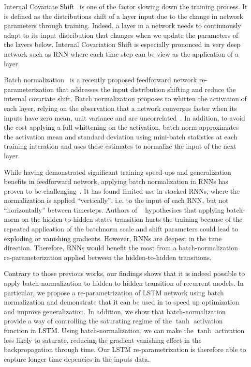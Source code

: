 \documentclass{article} %
\begin{document}
Internal Covariate Shift~\cite{shimodaira2000improving,batchnorm} is one of the factor slowing down the training process.
It is defined as the distributions shift of a layer input due to the change in network parameters through training.
Indeed, a layer in a network needs to continuously adapt to its input distribution that changes when we update the parameters of the layers below.
Internal Covariation Shift is especially prononced in very deep network such as RNN where each time-step can be view as the application of a layer.

Batch normalization~\cite{batchnorm} is a recently proposed feedforward network re-parameterization that addresses the input distribution shifting and reduce the internal covariate shift.
Batch normalization proposes to whitten the activation of each layer, relying on the observation that a network converges faster when its inputs
have zero mean, unit variance and are uncorrelated~\cite{efficientbackprop}.
In addition, to avoid the cost applying a full whittening on the activation,
batch norm approximates the activation mean and standard deviation using mini-batch statistics at each training interation
and uses these estimates to normalize the input of the next layer.

While having demonstrated significant training speed-ups and generalization benefits in feedforward network, applying batch normalization in RNNs has proven to be challenging~\cite{cesar,baidu}.
It has found limited use in stacked RNNs, where the normalization is applied ``vertically'', i.e. to the input of each RNN, but not ``horizontally'' between timesteps.
Authors of ~\cite{cesar} hypothesises that applying batch-norm on the hidden-to-hidden states transition hurts the training
because of the repeated application of the batchnorm scale and shift parameters could lead to exploding or vanishing gradients.
 However, RNNs are deepest in the time direction. Therefore, RNNs would  benefit the most from a batch-normalization re-parameterization applied between the hidden-to-hidden transitions.


Contrary to those previous works, our findings shows that it is indeed possible to apply batch-normalization to hidden-to-hidden transition of recurrent models. In particular, we propose a re-parametrization of LSTM network using batch normalization and demonstrate that it can be used in to speed up optimization and improve generalization.
In addition, we show that batch-normalization provide a way of controlling the saturating  regime of the $\tanh$ activation function in LSTM.
Using batch-normalization, we can make the  $\tanh$ activation less likely
to saturate, reducing the gradient vanishing effect in the backpropagation through time. Our LSTM re-parametrization is therefore able to capture longer time-depencies in the inputs data.
\end{document}
